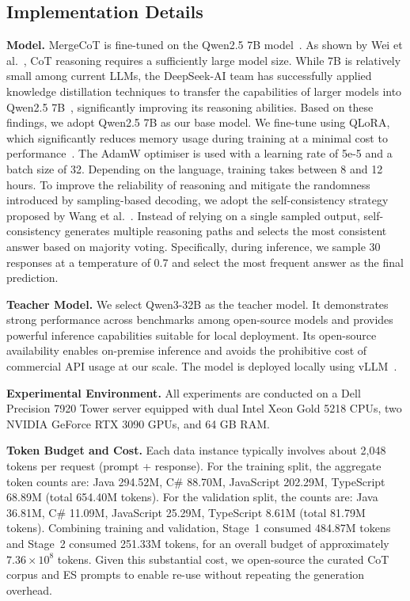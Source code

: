 \documentclass[sigconf,review,anonymous]{acmart}
\begin{document}
\subsection{Implementation Details}
\textbf{Model.} MergeCoT is fine-tuned on the Qwen2.5 7B model~\cite{qwen25}. As shown by Wei et al.~\cite{cot}, CoT reasoning requires a sufficiently large model size. 
While 7B is relatively small among current LLMs, the DeepSeek-AI team has successfully applied knowledge distillation techniques to transfer the capabilities of larger models into Qwen2.5 7B~\cite{deepseekr1}, significantly improving its reasoning abilities. Based on these findings, we adopt Qwen2.5 7B as our base model. 
We fine-tune using QLoRA, which significantly reduces memory usage during training at a minimal cost to performance~\cite{qlora}. 
The AdamW optimiser is used with a learning rate of 5e-5 and a batch size of 32. 
Depending on the language, training takes between 8 and 12 hours. To improve the reliability of reasoning and mitigate the randomness introduced by sampling-based decoding, we adopt the self-consistency strategy proposed by Wang et al.~\cite{wang2022selfconsistencyArXiv}. Instead of relying on a single sampled output, self-consistency generates multiple reasoning paths and selects the most consistent answer based on majority voting. Specifically, during inference, we sample 30 responses at a temperature of 0.7 and select the most frequent answer as the final prediction.

\textbf{Teacher Model.} We select Qwen3-32B as the teacher model. It demonstrates strong performance across benchmarks among open-source models and provides powerful inference capabilities suitable for local deployment. Its open-source availability enables on-premise inference and avoids the prohibitive cost of commercial API usage at our scale. The model is deployed locally using vLLM~\cite{vllmArXiv}.

\textbf{Experimental Environment.} All experiments are conducted on a Dell Precision 7920 Tower server equipped with dual Intel Xeon Gold 5218 CPUs, two NVIDIA GeForce RTX 3090 GPUs, and 64 GB RAM.

\textbf{Token Budget and Cost.} Each data instance typically involves about 2{,}048 tokens per request (prompt + response). For the training split, the aggregate token counts are: Java 294.52M, C\# 88.70M, JavaScript 202.29M, TypeScript 68.89M (total 654.40M tokens). For the validation split, the counts are: Java 36.81M, C\# 11.09M, JavaScript 25.29M, TypeScript 8.61M (total 81.79M tokens). Combining training and validation, Stage~1 consumed 484.87M tokens and Stage~2 consumed 251.33M tokens, for an overall budget of approximately $7.36\times 10^8$ tokens. Given this substantial cost, we open-source the curated CoT corpus and ES prompts to enable re-use without repeating the generation overhead.
\end{document}
